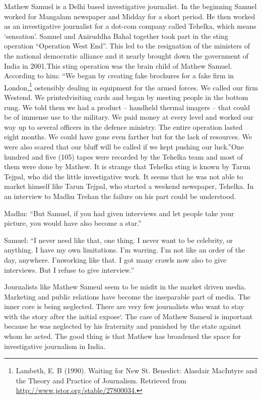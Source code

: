 \begin{multicols}{2}
\noi
Mathew Samuel is a Delhi based investigative journalist. In the beginning Samuel worked for
Mangalam newspaper and Midday for a short period. He then worked as an investigative
journalist for a dot-com company called Tehelka, which means ‘sensation’. Samuel and
Aniruddha Bahal together took part in the sting operation “Operation West End”. This led to
the resignation of the ministers of the national democratic alliance and it nearly brought down
the government of India in 2001.This sting operation was the brain child of Mathew Samuel.
According to him: “We began by creating fake brochures for a fake firm in London,\footnote{Lambeth, E. B (1990). Waiting for New St. Benedict: Alasdair MacIntyre and the Theory and Practice of Journalism. Retrieved from \url{http://www.jstor.org/stable/27800034.}} ostensibly dealing in equipment for the armed forces. We called our firm Westend. We printedvisiting cards and began by meeting people in the bottom rung. We told them we had a product – handheld thermal imagers – that could be of immense use to the military. We paid money at
every level and worked our way up to several officers in the defence ministry. The entire
operation lasted eight months. We could have gone even farther but for the lack of resources.
We were also scared that our bluff will be called if we kept pushing our luck.”One hundred and
five (105) tapes were recorded by the Tehelka team and most of them were done by Mathew.
It is strange that Tehelka sting is known by Tarun Tejpal, who did the little investigative work.
It seems that he was not able to market himself like Tarun Tejpal, who started a weekend
newspaper, Tehelka. In an interview to Madhu Trehan the failure on his part could be
understood.

\noi
Madhu: “But Samuel, if you had given interviews and let people take your picture, you would
have also become a star.”

\noi
Samuel: “I never need like that, one thing. I never want to be celebrity, or anything. I have my
own limitations. I’m warring. I’m not like an order of the day, anywhere. I’mworking like that.
I got many crawls now also to give interviews. But I refuse to give interview.”

\noi
Journalists like Mathew Sameul seem to be misfit in the market driven media. Marketing and
public relations have become the inseparable part of media. The inner core is being neglected.
There are very few journalists who want to stay with the story after the initial expose`. The
case of Mathew Sameul is important because he was neglected by his fraternity and punished
by the state against whom he acted. The good thing is that Mathew has broadened the space for
investigative journalism in India.


\end{multicols}
